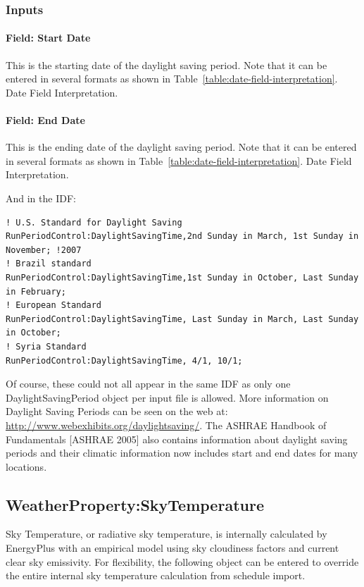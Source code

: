 \subsubsection{Inputs}\label{inputs-7-013}

\paragraph{Field: Start Date}\label{field-start-date-1}

This is the starting date of the daylight saving period. Note that it can be entered in several formats as shown in Table~\ref{table:date-field-interpretation}. Date Field Interpretation.

\paragraph{Field: End Date}\label{field-end-date}

This is the ending date of the daylight saving period. Note that it can be entered in several formats as shown in Table~\ref{table:date-field-interpretation}. Date Field Interpretation.

And in the IDF:

\begin{lstlisting}
! U.S. Standard for Daylight Saving
RunPeriodControl:DaylightSavingTime,2nd Sunday in March, 1st Sunday in November; !2007
! Brazil standard
RunPeriodControl:DaylightSavingTime,1st Sunday in October, Last Sunday in February;
! European Standard
RunPeriodControl:DaylightSavingTime, Last Sunday in March, Last Sunday in October;
! Syria Standard
RunPeriodControl:DaylightSavingTime, 4/1, 10/1;
\end{lstlisting}

Of course, these could not all appear in the same IDF as only one DaylightSavingPeriod object per input file is allowed. More information on Daylight Saving Periods can be seen on the web at: \url{http://www.webexhibits.org/daylightsaving/}. The ASHRAE Handbook of Fundamentals {[}ASHRAE 2005{]} also contains information about daylight saving periods and their climatic information now includes start and end dates for many locations.

\subsection{WeatherProperty:SkyTemperature}\label{weatherpropertyskytemperature}

Sky Temperature, or radiative sky temperature, is internally calculated by EnergyPlus with an empirical model using sky cloudiness factors and current clear sky emissivity. For flexibility, the following object can be entered to override the entire internal sky temperature calculation from schedule import.


